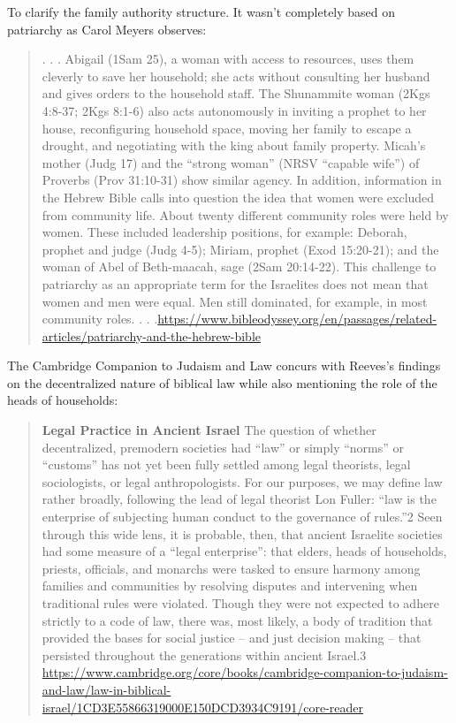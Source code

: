 \documentclass[11pt]{article}
\begin{document}
{To clarify the family authority structure. It wasn't completely based on patriarchy as Carol Meyers observes:
\begin{quote}
. . . 
 Abigail (1Sam 25), a woman with access to resources, uses them cleverly to save her household; she acts without consulting her husband and gives orders to the household staff. The Shunammite woman (2Kgs 4:8-37; 2Kgs 8:1-6) also acts autonomously in inviting a prophet to her house, reconfiguring household space, moving her family to escape a drought, and negotiating with the king about family property. Micah’s mother (Judg 17) and the “strong woman” (NRSV “capable wife”) of Proverbs (Prov 31:10-31) show similar agency. In addition, information in the Hebrew Bible calls into question the idea that women were excluded from community life. About twenty different community roles were held by women. These included leadership positions, for example: Deborah, prophet and judge (Judg 4-5); Miriam, prophet (Exod 15:20-21); and the woman of Abel of Beth-maacah, sage (2Sam 20:14-22). This challenge to patriarchy as an appropriate term for the Israelites does not mean that women and men were equal. Men still dominated, for example, in most community roles. . . .\url{https://www.bibleodyssey.org/en/passages/related-articles/patriarchy-and-the-hebrew-bible}
\end{quote}

The Cambridge Companion to Judaism and Law concurs with Reeves's findings on the decentralized nature of biblical law while also mentioning the role of the heads of households:

\begin{quote}
\textbf{Legal Practice in Ancient Israel}
The question of whether decentralized, premodern societies had “law” or simply “norms” or “customs” has not yet been fully settled among legal theorists, legal sociologists, or legal anthropologists. For our purposes, we may define law rather broadly, following the lead of legal theorist Lon Fuller: “law is the enterprise of subjecting human conduct to the governance of rules.”2 Seen through this wide lens, it is probable, then, that ancient Israelite societies had some measure of a “legal enterprise”: that elders, heads of households, priests, officials, and monarchs were tasked to ensure harmony among families and communities by resolving disputes and intervening when traditional rules were violated. Though they were not expected to adhere strictly to a code of law, there was, most likely, a body of tradition that provided the bases for social justice – and just decision making – that persisted throughout the generations within ancient Israel.3 \url{https://www.cambridge.org/core/books/cambridge-companion-to-judaism-and-law/law-in-biblical-israel/1CD3E55866319000E150DCD3934C9191/core-reader}
\end{quote} 

}
\end{document}

